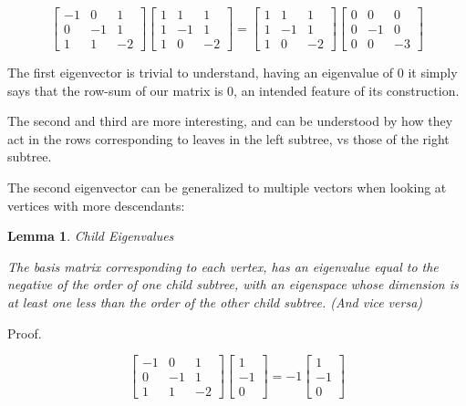 \documentclass[10pt,a4paper]{report}
\newtheorem{lemma}{Lemma}
\begin{document}
\begin{equation*}
\left[\begin{matrix}
	-1 & 0 & 1\\
	0 & -1 & 1\\
	1 & 1 & -2
\end{matrix}\right]
\left[\begin{matrix}
	1 & 1 & 1\\
	1 & -1 & 1\\
	1 & 0 & -2
\end{matrix}\right]
=
\left[\begin{matrix}
	1 & 1 & 1\\
	1 & -1 & 1\\
	1 & 0 & -2
\end{matrix}\right]
\left[\begin{matrix}
	0 & 0 & 0\\
	0 & -1 & 0\\
	0 & 0 & -3
\end{matrix}\right]
\end{equation*}

The first eigenvector is trivial to understand, having an eigenvalue of 0 it
simply says that the row-sum of our matrix is 0, an intended feature of its
construction.

The second and third are more interesting, and can be understood by how they
act in the rows corresponding to leaves in the left subtree, vs those of the
right subtree.

The second eigenvector can be generalized to multiple vectors when looking at
vertices with more descendants:

\begin{lemma} Child Eigenvalues

	The basis matrix corresponding to each vertex, has an eigenvalue equal to the
	negative of the order of one child subtree, with an eigenspace whose
	dimension is at least one less than the order of the other child subtree.
	(And vice versa)
\end{lemma}

Proof.

\begin{equation*}
\left[\begin{matrix}
	-1 & 0 & 1\\
	0 & -1 & 1\\
	1 & 1 & -2
\end{matrix}\right]
\left[\begin{matrix}
	1\\
	-1\\
	0
\end{matrix}\right]
=
-1
\left[\begin{matrix}
	1\\
	-1\\
	0
\end{matrix}\right]
\end{equation*}
\end{document}
